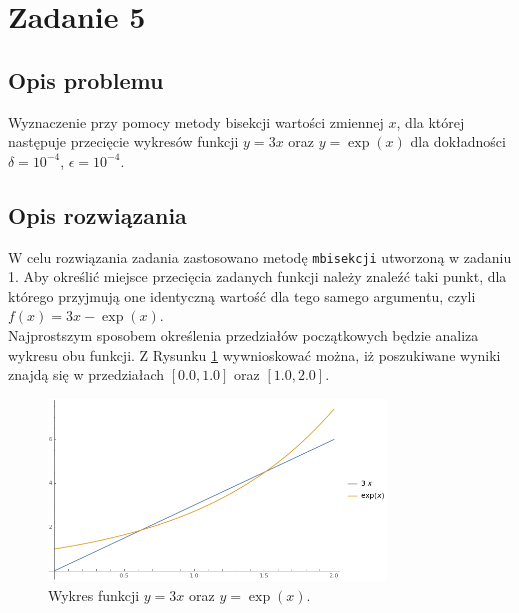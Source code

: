 \documentclass{classrep}
\begin{document}
\section{Zadanie 5}
	\subsection{Opis problemu}
		Wyznaczenie przy pomocy metody bisekcji wartości zmiennej $x$, dla której następuje przecięcie wykresów funkcji $y=3x$ oraz $y=\exp(x)$ dla dokładności $\delta=10^{-4}$, $\epsilon=10^{-4}$.
	
	\subsection{Opis rozwiązania}
		W celu rozwiązania zadania zastosowano metodę \texttt{mbisekcji} utworzoną w zadaniu 1.
		Aby określić miejsce przecięcia zadanych funkcji należy znaleźć taki punkt, dla którego przyjmują one identyczną wartość dla tego samego argumentu, czyli $f(x)=3x-\exp(x)$. 	\\
		 Najprostszym sposobem określenia przedziałów początkowych będzie analiza wykresu obu funkcji. Z Rysunku \ref{fig:1} wywnioskować można, iż poszukiwane wyniki znajdą się w przedziałach $[0.0,1.0]$ oraz $[1.0,2.0]$.
		
		\begin{figure}[!htbp]
			\centering
			\includegraphics[width=0.8\textwidth]{zadania/plot51.png}
  			\caption{Wykres funkcji $y=3x$ oraz $y=\exp(x)$.}
  			\label{fig:1}
		\end{figure}	
		
\end{document}

